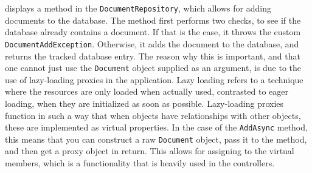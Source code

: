  displays a method in the \texttt{DocumentRepository}, which allows for adding documents to the database.
The method first performs two checks, to see if the database already contains a document.
If that is the case, it throws the custom \texttt{DocumentAddException}.
Otherwise, it adds the document to the database, and returns the tracked database entry.
The reason why this is important, and that one cannot just use the \texttt{Document} object supplied as an argument, is due to the use of lazy-loading proxies in the application.
Lazy loading refers to a technique where the resources are only loaded when actually used, contrasted to eager loading, when they are initialized as soon as possible.
Lazy-loading proxies function in such a way that when objects have relationships with other objects, these are implemented as virtual properties.
In the case of the \texttt{AddAsync} method, this means that you can construct a raw \texttt{Document} object, pass it to the method, and then get a proxy object in return.
This allows for assigning to the virtual members, which is a functionality that is heavily used in the controllers.

